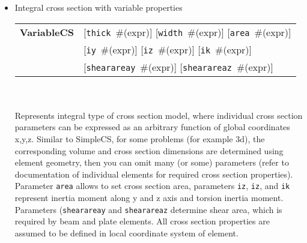 \documentclass[a4paper]{report}
\newcommand{\param}[1]{\texttt{#1}} %
\newcommand{\optional}[1]{[#1]} %
\newcommand{\field}[2]{\param{#1}~\#{\tiny(#2)}} %
\newcommand{\optField}[2]{\optional{\field{#1}{#2}}}
\newcommand{\entKeywordInst}[1]{\textbf{#1}} %
\newenvironment{record}[1][]{\begin{tabular}{|ll}}{\end{tabular}\\}
\newcommand{\recentry}[2]{{#1}&{#2}\\}
\newcounter{rcc}
\newenvironment{record}[1][\textwidth]{\setcounter{rcc}{0}\rowcolors{1}{lightgray}{lightgray}\tabularx{#1}{llR} \hline}
               {\endtabularx}
\newcommand{\recentry}[2]{\ifthenelse{\value{rcc}>0}{$\backslash$ \\}{\setcounter{rcc}{1}}{#1}&{#2}&}
\begin{document}
\begin{itemize}
\item
Integral cross section with variable properties\\
\begin{record}[0.9\textwidth]
  \recentry{\entKeywordInst{VariableCS}}{\optField{thick}{expr} \optField{width}{expr} \optField{area}{expr}}
  \recentry{}{\optField{iy}{expr} \optField{iz}{expr} \optField{ik}{expr}}
  \recentry{}{\optField{shearareay}{expr} \optField{shearareaz}{expr} }
\end{record}\\
Represents integral type of cross section model, where individual cross section parameters can be expressed as an arbitrary function of global coordinates x,y,z. Similar to SimpleCS, for some problems (for example 3d), the corresponding volume and cross section dimensions are
determined using element geometry, then you can omit many (or some) parameters (refer to documentation of individual elements for required cross section properties). 
Parameter \param{area} allows to set cross section area, parameters \param{iz}, \param{iz}, and \param{ik} represent 
inertia moment along y and z axis and torsion inertia moment. Parameters (\param{shearareay} and \param{shearareaz} determine shear area, which is required by beam and plate elements. All cross section properties are assumed to be defined in local coordinate system of element.\\


\end{itemize}
\end{document}
